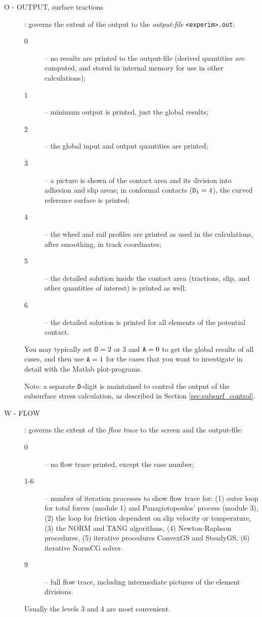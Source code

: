 \documentclass[12pt]{report}
\begin{document}
\begin{description}
\item[O - OUTPUT, surface tractions] \label{o-digit} : governs the extent
        of the output to the {\em output-file\/} {\tt <experim>\-.out}:
\begin{description}
\item[0] -- no results are printed to the output-file (derived quantities
        {\em are\/} computed, and stored in internal memory for use in
        other calculations);
\item[1] -- minimum output is printed, just the global results;
\item[2] -- the global input and output quantities are printed;
\item[3] -- a picture is shown of the contact area and its division into
        adhesion and slip areas; in conformal contacts (${\tt D}_1=4$),
        the curved reference surface is printed;
\item[4] -- the wheel and rail profiles are printed as used in the
        calculations, after smoothing, in track coordinates;
\item[5] -- the detailed solution inside the contact area (tractions, slip,
        and other quantities of interest) is printed as well;
\item[6] -- the detailed solution is printed for all elements of the
        potential contact.
\end{description}
You may typically set ${\tt O}=2$ or 3 and ${\tt A}=0$ to get the global
results of all cases, and then use ${\tt A}=1$ for the cases that you want to
investigate in detail with the Matlab plot-programs.

Note: a separate {\tt O}-digit is maintained to control the output
of the subsurface stress calculation, as described in Section
\ref{sec:subsurf_control}.

\item[W - FLOW] \label{w-digit} : governs the extent of the {\em flow
        trace\/} to the screen and the output-file:
\begin{description}
\item[0] -- no flow trace printed, except the case number;
\item[\hspace{-4mm}1-6] -- number of iteration processes to show flow trace for: 
        (1) outer loop for total forces (module 1) and Panagiotopoulos'
        process (module 3), (2) the loop for friction dependent on slip
        velocity or temperature, (3) the NORM and TANG algorithms, 
        (4) New\-ton-Raph\-son procedures, (5) iterative procedures
        ConvexGS and SteadyGS, (6) iterative NormCG solver.
\item[9] -- full flow trace, including intermediate pictures of the element
        divisions.
\end{description}
Usually the levels 3 and 4 are most convenient.


\end{description}
\end{document}
